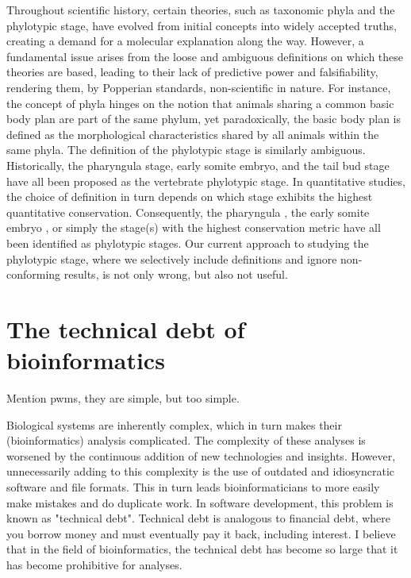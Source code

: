 Throughout scientific history, certain theories, such as taxonomic phyla and the phylotypic stage, have evolved from initial concepts into widely accepted truths, creating a demand for a molecular explanation along the way. However, a fundamental issue arises from the loose and ambiguous definitions on which these theories are based, leading to their lack of predictive power and falsifiability, rendering them, by Popperian standards, non-scientific in nature. For instance, the concept of phyla hinges on the notion that animals sharing a common basic body plan are part of the same phylum, yet paradoxically, the basic body plan is defined as the morphological characteristics shared by all animals within the same phyla\cite{BUDD2000,scholtz2004bauplane}. The definition of the phylotypic stage is similarly ambiguous. Historically, the pharyngula stage\cite{BALLARD1981}, early somite embryo\cite{Alberch1993}, and the tail bud stage \cite{Slack1993} have all been proposed as the vertebrate phylotypic stage. In quantitative studies, the choice of definition in turn depends on which stage exhibits the highest quantitative conservation. Consequently, the pharyngula \cite{Irie2011,marletaz2018}, the early somite embryo \cite{DomazetLoso2010}, or simply the stage(s) with the highest conservation metric\cite{Kalinka2010,Cordero2020} have all been identified as phylotypic stages. Our current approach to studying the phylotypic stage, where we selectively include definitions and ignore non-conforming results, is not only wrong, but also not useful.

\section{The technical debt of bioinformatics}

Mention pwms, they are simple, but too simple.

Biological systems are inherently complex, which in turn makes their (bioinformatics) analysis complicated. The complexity of these analyses is worsened by the continuous addition of new technologies and insights. However, unnecessarily adding to this complexity is the use of outdated and idiosyncratic software and file formats. This in turn leads bioinformaticians to more easily make mistakes and do duplicate work. In software development, this problem is known as "technical debt". Technical debt is analogous to financial debt, where you borrow money and must eventually pay it back, including interest. I believe that in the field of bioinformatics, the technical debt has become so large that it has become prohibitive for analyses.

